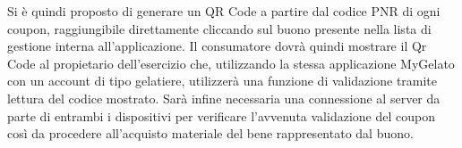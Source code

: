 Si è quindi proposto di generare un QR Code a partire dal codice PNR di ogni coupon, raggiungibile direttamente cliccando sul buono presente nella lista di gestione interna all'applicazione.
Il consumatore dovrà quindi mostrare il Qr Code al propietario dell'esercizio che, utilizzando la stessa applicazione MyGelato con un account di tipo gelatiere, utilizzerà una funzione di validazione tramite lettura del codice mostrato.
Sarà infine necessaria una connessione al server da parte di entrambi i dispositivi per verificare l'avvenuta validazione del coupon così da procedere all'acquisto materiale del bene rappresentato dal buono.

\newpage
